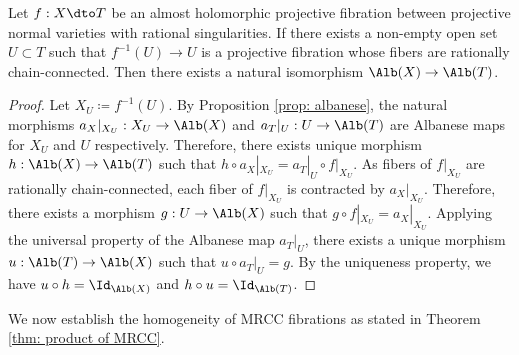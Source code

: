 \documentclass[11pt]{amsart}
\begin{document}
\begin{lemma}\label{lem: Alb for MRCC fibration}
Let $f:X \dto T$ be an almost holomorphic projective fibration between projective normal varieties with rational singularities. If there exists a non-empty open set $U\subset T$ such that $f^{-1}(U) \to U$ is a projective fibration whose fibers are rationally chain-connected. Then there exists a natural isomorphism $\Alb(X) \to \Alb(T)$.
\end{lemma}
\begin{proof}
    Let $X_U \coloneqq f^{-1}(U)$. By Proposition \ref{prop: albanese}, the natural morphisms $a_X|_{X_U}: X_U \to \Alb(X)$ and $a_T|_U: U \to \Alb(T)$ are Albanese maps for $X_U$ and $U$ respectively. Therefore, there exists unique morphism $h: \Alb(X) \to \Alb(T)$ such that $h \circ a_X|_{X_U} = a_T|_U\circ f|_{X_U}$. As fibers of $f|_{X_U}$ are rationally chain-connected, each fiber of $f|_{X_U}$ is contracted by $a_X|_{X_U}$. Therefore, there exists a morphism $g: U \to \Alb(X)$ such that $g \circ f|_{X_U} = a_X|_{X_U}$. Applying the universal property of the Albanese map $a_T|_{U}$, there exists a unique morphism $u: \Alb(T) \to \Alb(X)$ such that $u\circ a_T|_{U}=g$. By the uniqueness property, we have $u \circ h = \Id_{\Alb(X)}$ and $h \circ u = \Id_{\Alb(T)}$.
\end{proof}

We now establish the homogeneity of MRCC fibrations as stated in Theorem \ref{thm: product of MRCC}.
\end{document}
